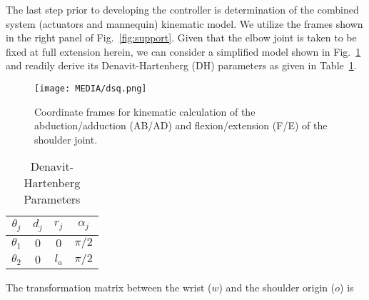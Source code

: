 \documentclass[letterpaper, 10pt, conference]{ieeeconf}      %
\begin{document}
The last step prior to developing the controller is determination of the combined system (actuators and mannequin) kinematic model. We utilize the frames shown in the right panel of Fig.~\ref{fig:support}. Given that the elbow joint is taken to be fixed at full extension herein, we can consider a simplified model shown in Fig.~\ref{fig:coord} and readily derive its Denavit-Hartenberg (DH) parameters as given in Table~\ref{table:dh}.

\begin{figure}[!t]
   \vspace{2pt}
   \centering
   \texttt{[image: MEDIA/dsq.png]}
      \vspace{-9pt}
      \caption{Coordinate frames for kinematic calculation of the abduction/adduction (AB/AD) and flexion/extension (F/E) of the shoulder joint.}
      \label{fig:coord}
      \vspace{-4pt}
\end{figure}


\begin{table}[!ht]
\vspace{0pt}
\centering
\caption{Denavit-Hartenberg Parameters}
\label{table:dh}
\vspace{-6pt}
\begin{tabular}{cccc}
\toprule
\textbf{$\theta_j$} & \textbf{$d_j$} & \textbf{$r_j$}  & \textbf{$\alpha_j$} \\ \midrule
$\theta_1$ & $0$    & $0$ & $\pi/2$                     \\
$\theta_2$ & $0$    & $l_a$ & $\pi/2$ \\
\bottomrule
\end{tabular}
\vspace{-12pt}
\end{table}
 
The transformation matrix between the wrist ($w$) and the shoulder origin ($o$) is 
\end{document}
